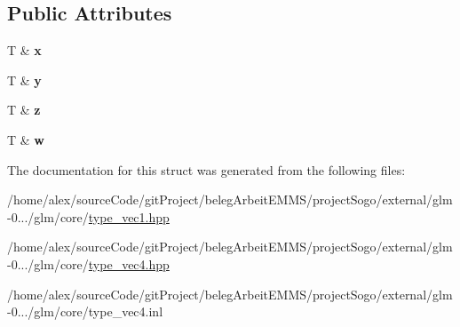 \subsection*{Public Attributes}
\begin{DoxyCompactItemize}
\item 
\hypertarget{structglm_1_1detail_1_1tref4_ab32630a2702b20d2c40cda8e2f656908}{T \& {\bfseries x}}\label{structglm_1_1detail_1_1tref4_ab32630a2702b20d2c40cda8e2f656908}

\item 
\hypertarget{structglm_1_1detail_1_1tref4_a6aa739c6a296a62be6affef3a364873a}{T \& {\bfseries y}}\label{structglm_1_1detail_1_1tref4_a6aa739c6a296a62be6affef3a364873a}

\item 
\hypertarget{structglm_1_1detail_1_1tref4_ac87b56230150da4d731b70dc1bafaccc}{T \& {\bfseries z}}\label{structglm_1_1detail_1_1tref4_ac87b56230150da4d731b70dc1bafaccc}

\item 
\hypertarget{structglm_1_1detail_1_1tref4_a697261241694b19906b807f17ed71582}{T \& {\bfseries w}}\label{structglm_1_1detail_1_1tref4_a697261241694b19906b807f17ed71582}

\end{DoxyCompactItemize}


The documentation for this struct was generated from the following files\-:\begin{DoxyCompactItemize}
\item 
/home/alex/source\-Code/git\-Project/beleg\-Arbeit\-E\-M\-M\-S/project\-Sogo/external/glm-\/0.../glm/core/\hyperlink{type__vec1_8hpp}{type\-\_\-vec1.\-hpp}\item 
/home/alex/source\-Code/git\-Project/beleg\-Arbeit\-E\-M\-M\-S/project\-Sogo/external/glm-\/0.../glm/core/\hyperlink{type__vec4_8hpp}{type\-\_\-vec4.\-hpp}\item 
/home/alex/source\-Code/git\-Project/beleg\-Arbeit\-E\-M\-M\-S/project\-Sogo/external/glm-\/0.../glm/core/type\-\_\-vec4.\-inl\end{DoxyCompactItemize}
